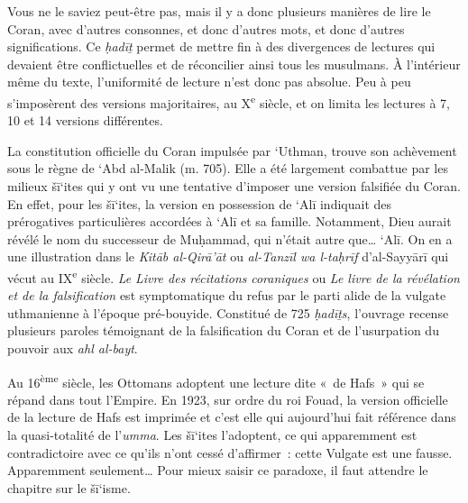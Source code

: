 Vous ne le saviez peut-être pas, mais il y a donc plusieurs manières de
lire le Coran, avec d'autres consonnes, et donc d'autres mots, et donc
d'autres significations. Ce \emph{ḥadīṯ} permet de mettre fin à des
divergences de lectures qui devaient être conflictuelles et de
réconcilier ainsi tous les musulmans. À l'intérieur même du texte,
l'uniformité de lecture n'est donc pas absolue. Peu à peu s'imposèrent
des versions majoritaires, au X\textsuperscript{e} siècle, et on limita
les lectures à 7, 10 et 14 versions différentes.

La constitution officielle du Coran impulsée par `Uthman, trouve son
achèvement sous le règne de `Abd al-Malik (m. 705). Elle a été largement
combattue par les milieux šī`ites qui y ont vu une tentative d'imposer
une version falsifiée du Coran. En effet, pour les šī`ites, la version
en possession de `Alī indiquait des prérogatives particulières accordées
à `Alī et sa famille. Notamment, Dieu aurait révélé le nom du successeur
de Muḥammad, qui n'était autre que\ldots{} `Alī. On en a une
illustration dans le \emph{Kitāb al-Qirā'āt} ou \emph{al-Tanzīl wa
l-taḥrīf} d'al-Sayyārī qui vécut au IX\textsuperscript{e} siècle.
\emph{Le} \emph{Livre des récitations} \emph{coraniques} ou \emph{Le
livre de la révélation et de la falsification} est symptomatique du
refus par le parti alide de la vulgate uthmanienne à l'époque
pré-bouyide. Constitué de 725 \emph{ḥadīṯs}, l'ouvrage recense plusieurs
paroles témoignant de la falsification du Coran et de l'usurpation du
pouvoir aux \emph{ahl al-bayt}.

Au 16\textsuperscript{ème} siècle, les Ottomans adoptent une lecture
dite «~de Hafs~» qui se répand dans tout l'Empire. En 1923, sur ordre du
roi Fouad, la version officielle de la lecture de Hafs est imprimée et
c'est elle qui aujourd'hui fait référence dans la quasi-totalité de
l'\emph{umma}. Les šī`ites l'adoptent, ce qui apparemment est
contradictoire avec ce qu'ils n'ont cessé d'affirmer~: cette Vulgate est
une fausse. Apparemment seulement\ldots{} Pour mieux saisir ce paradoxe,
il faut attendre le chapitre sur le šī`isme.




